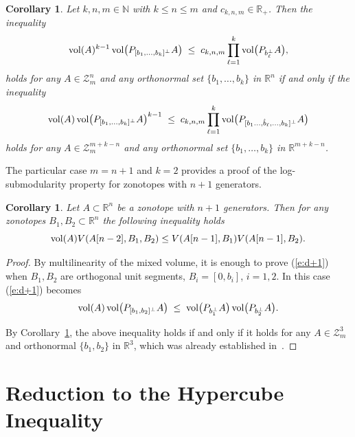 \documentclass[11pt]{amsart}
\newcommand{\R}{\mathbb R}
\newcommand{\Z}{\mathcal Z}
\newcommand{\N}{\mathbb N}
\def\vol{{\rm vol}}
\newtheorem{cor}[thm]{Corollary}
\theoremstyle{definition}
\theoremstyle{remark}
\begin{document}
\begin{cor}\label{C:dual-inequalities}
Let $k,n,m\in\N$ with $k\leq n\leq m$ and $c_{k,n,m}\in\R_{+}$.
Then the inequality
\begin{equation}\label{eq:projection-2}
\vol(A)^{k-1} \, \vol\bigl( P_{[b_1,\dots,b_k]^\perp} A \bigr)
\;\leq\; c_{k,n,m}
\prod_{\ell=1}^k \vol\bigl( P_{b_\ell^\perp} A \bigr),
\end{equation}
holds for any $A\in\Z_m^n$ and any orthonormal set $\{b_1,\dots,b_k\}$ in $\R^n$ if and only if the inequality 
\begin{equation}\label{eq:projection_dual-2}
\vol(A) \, \vol\bigl( P_{[b_1,\dots, b_k]^\perp} A \bigr)^{k-1}
\;\le\; c_{k,n,m}
\prod_{\ell=1}^k \vol\bigl( P_{[b_1 \dots, \hat b_\ell,\dots, b_k]^\perp} A \bigr)
\end{equation}
holds for any $A\in\Z_m^{m+k-n}$ and any orthonormal set $\{b_1,\dots,b_{k}\}$ in $\R^{m+k-n}$.
\end{cor}

The particular case $m=n+1$ and $k=2$ provides a proof of the log-submodularity property for zonotopes with $n+1$ generators.

\begin{cor}\label{cor:d+1}
    Let $A\subset\R^n$ be a zonotope with $n+1$ generators. Then for any zonotopes $B_1,B_2\subset\R^n$ the following inequality holds
    \begin{equation}\label{e:d+1}
    \vol(A)V(A[n-2],B_1,B_2)\leq V(A[n-1],B_1)V(A[n-1],B_2).   
    \end{equation}
\end{cor}

\begin{proof}
By multilinearity of the mixed volume, it is enough to prove (\ref{e:d+1}) when $B_1,B_2$ are orthogonal unit segments, $B_i=[0,b_i]$, $i=1,2$. In this case (\ref{e:d+1}) becomes
\begin{equation*}
 \vol(A)\,\vol\bigl( P_{[b_1,b_2]^\perp} A \bigr)
\;\leq\; 
\vol\bigl( P_{b_1^\perp} A \bigr)\,\vol\bigl( P_{b_2^\perp} A \bigr). 
\end{equation*}

By Corollary~\ref{C:dual-inequalities}, the above inequality holds if and only if it holds for any $A\in\Z_m^3$ and orthonormal $\{b_1,b_2\}$ in $\R^3$, which was already established in~\cite{FMMZ}.
\end{proof}


\section{Reduction to the Hypercube Inequality}\label{sec:HIvsPI}
\end{document}
